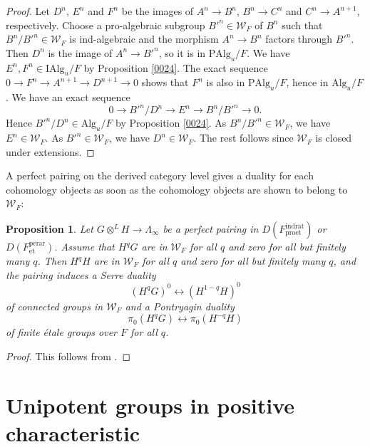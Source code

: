 \documentclass{amsart}
\newtheorem{Prop}[Thm]{Proposition}
\theoremstyle{remark}
\numberwithin{equation}{section}
\newcommand{\tensor}{\mathbin{\otimes}}
\newcommand{\et}{\mathrm{et}}
\newcommand{\rat}{\mathrm{rat}}
\newcommand{\ind}{\mathrm{ind}}
\newcommand{\pro}{\mathrm{pro}}
\newcommand{\perar}{\mathrm{perar}}
\newcommand{\Alg}{\mathrm{Alg}}
\newcommand{\Ind}{\mathrm{I}}
\newcommand{\Pro}{\mathrm{P}}
\begin{document}
\begin{proof}
	Let $D^{n}$, $E^{n}$ and $F^{n}$ be the images of
	$A^{n} \to B^{n}$, $B^{n} \to C^{n}$ and $C^{n} \to A^{n + 1}$, respectively.
	Choose a pro-algebraic subgroup  $B'^{n} \in \mathcal{W}_{F}$ of $B^{n}$
	such that $B^{n} / B'^{n} \in \mathcal{W}_{F}$ is ind-algebraic
	and the morphism $A^{n} \to B^{n}$ factors through $B'^{n}$.
	Then $D^{n}$ is the image of $A^{n} \to B'^{n}$, so it is in $\Pro \Alg_{u} / F$.
	We have $E^{n}, F^{n} \in \Ind \Alg_{u} / F$
	by Proposition \ref{0024}.
	The exact sequence $0 \to F^{n} \to A^{n + 1} \to D^{n + 1} \to 0$
	shows that $F^{n}$ is also in $\Pro \Alg_{u} / F$, hence in $\Alg_{u} / F$.
	We have an exact sequence
		\[
				0
			\to
				B'^{n} / D^{n}
			\to
				E^{n}
			\to
				B^{n} / B'^{n}
			\to
				0.
		\]
	Hence $B'^{n} / D^{n} \in \Alg_{u} / F$ by Proposition \ref{0024}.
	As $B^{n} / B'^{n} \in \mathcal{W}_{F}$, we have $E^{n} \in \mathcal{W}_{F}$.
	As $B'^{n} \in \mathcal{W}_{F}$, we have $D^{n} \in \mathcal{W}_{F}$.
	The rest follows since $\mathcal{W}_{F}$ is closed under extensions.
\end{proof}

A perfect pairing on the derived category level gives a duality for each cohomology objects
as soon as the cohomology objects are shown to belong to $\mathcal{W}_{F}$:

\begin{Prop} \label{0078}
	Let $G \tensor^{L} H \to \Lambda_{\infty}$ be a perfect pairing in
	$D(F^{\ind\rat}_{\pro\et})$ or $D(F^{\perar}_{\et})$.
	Assume that $H^{q} G$ are in $\mathcal{W}_{F}$ for all $q$
	and zero for all but finitely many $q$.
	Then $H^{q} H$ are in $\mathcal{W}_{F}$ for all $q$
	and zero for all but finitely many $q$,
	and the pairing induces a Serre duality
		\[
				(H^{q} G)^{0}
			\leftrightarrow
				(H^{1 - q} H)^{0}
		\]
	of connected groups in $\mathcal{W}_{F}$ and a Pontryagin duality
		\[
				\pi_{0}(H^{q} G)
			\leftrightarrow
				\pi_{0}(H^{- q} H)
		\]
	of finite \'etale groups over $F$ for all $q$.
\end{Prop}

\begin{proof}
	This follows from \cite[Propositions 3.1.7 and 3.1.9]{Suz24}.
\end{proof}


\section{Unipotent groups in positive characteristic}
\label{0113}
\end{document}

